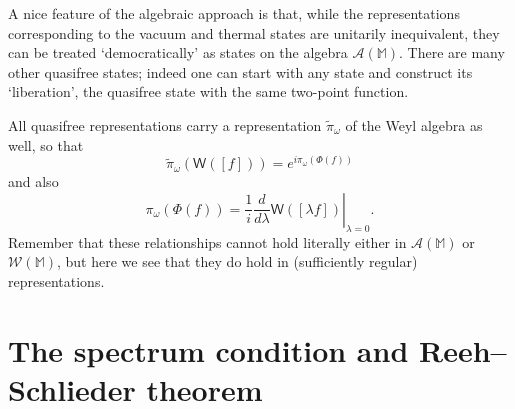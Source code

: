 \documentclass[12pt,a4paper]{article}
\newcommand{\1}{\mathds{1}}                         %
\newcommand{\MM}{\mathbb{M}}
\newcommand{\Ac}{{\mathcal{A}}}
\newcommand{\Wc}{{\mathcal{W}}}
\newcommand{\Ws}{{\mathsf{W}}}
\begin{document}
A nice feature of the algebraic approach is that, while the representations corresponding to the vacuum and thermal states are unitarily inequivalent, they can be treated `democratically' as states on the algebra $\Ac(\MM)$. There are many other quasifree states; indeed one can start with any state and construct its `liberation', the quasifree state with the same two-point function.

All quasifree representations carry a representation $\tilde{\pi}_\omega$ of the Weyl algebra as well, 
so that
\[
\tilde{\pi}_\omega(\Ws([f])) = e^{i\pi_\omega(\Phi(f))}
\]
and also 
\[
\pi_\omega(\Phi(f)) = \left.\frac{1}{i}\frac{d}{d\lambda} \Ws([\lambda f])\right|_{\lambda=0}.
\]
Remember that these relationships cannot hold literally either in $\Ac(\MM)$ or $\Wc(\MM)$, but here we see that they do hold in (sufficiently regular) representations.

\section{The spectrum condition and Reeh--Schlieder theorem} \label{sec:spectrum}
\end{document}

